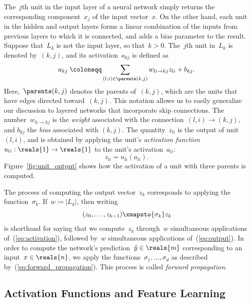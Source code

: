 \documentclass[11pt,a4paper]{article}
\numberwithin{equation}{section}
\newcommand{\weight}[2]{w_{#1 \rightarrow #2}}
\begin{document}
The~$j$th unit in the input layer of a neural network simply returns the
corresponding component~$x_j$ of the input vector~$x$. On the other hand, each
unit in the hidden and output layers forms a linear combination of the inputs
from previous layers to which it is connected, and adds a bias parameter to the
result. Suppose that~$L_k$ is not the input layer, so that~$k > 0$. The~$j$th
unit in~$L_k$ is denoted by~$(k, j)$, and its activation~$a_{kj}$ is defined as
\begin{equation}
	a_{kj} \;\coloneqq \sum_{(l, i) \in \parents(k, j)} \weight{li}{kj} z_{li} + b_{kj}.
	\label{eq:activation}
\end{equation}
Here,~$\parents(k, j)$ denotes the parents of~$(k, j)$, which are the units that
have edges directed toward~$(k, j)$. This notation allows us to easily
generalize our discussion to layered networks that incorporate skip connections.
The number~$\weight{li}{kj}$ is the \emph{weight} associated with the
connection~$(l, i) \rightarrow (k, j)$, and $b_{kj}$ the \emph{bias} associated
with $(k, j)$. The quantity~$z_{li}$ is the output of unit~$(l, i)$, and is
obtained by applying the unit's \emph{activation function} $u_{li} : \reals{1}
\to \reals{1}$ to the unit's activation~$a_{li}$:
\begin{equation}
	z_{li} = u_{li}(a_{li}).
	\label{eq:output}
\end{equation}
Figure~\ref{fig:unit_output} shows how the activation of a unit with three
parents is computed.

The process of computing the output vector~$z_k$ corresponds to applying the
function~$\sigma_k$. If~$w \coloneqq |L_k|$, then writing
\[
	(z_0, \ldots, z_{k - 1}) \xmapsto{\sigma_k} z_k
\]
is shorthand for saying that we compute~$z_k$ through~$w$ simultaneous
applications of~(\ref{eq:activation}), followed by~$w$ simultaneous
applications of~(\ref{eq:output}). In order to compute the network's
prediction~$\hat{y} \in \reals{m}$ corresponding to an input~$x \in \reals{n}$,
we apply the functions~$\sigma_1, \ldots, \sigma_d$ as described
by~(\ref{eq:forward_propagation}). This process is called \emph{forward
propagation}.

\subsection{Activation Functions and Feature Learning}
\label{sec:act_func_and_feature_learning}
\end{document}
